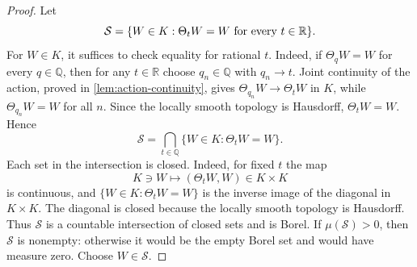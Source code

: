 \documentclass[11pt]{amsart}
\theoremstyle{plain}
\theoremstyle{definition}
\theoremstyle{remark}
\numberwithin{equation}{section}
\begin{document}
\begin{proof}
Let
\[
   \mathcal S=\{W\in K:\Theta_tW=W\hbox{ for every }t\in\mathbb R\}.
\]
For \(W\in K\), it suffices to check equality for rational \(t\).  Indeed,
if \(\Theta_qW=W\) for every \(q\in\mathbb Q\), then for any
\(t\in\mathbb R\) choose \(q_n\in\mathbb Q\) with \(q_n\to t\).  Joint
continuity of the action, proved in \cref{lem:action-continuity}, gives
\(\Theta_{q_n}W\to\Theta_tW\) in \(K\), while \(\Theta_{q_n}W=W\) for all
\(n\).  Since the locally smooth topology is Hausdorff, \(\Theta_tW=W\).
Hence
\[
   \mathcal S
   =
   \bigcap_{t\in\mathbb Q}
   \{W\in K:\Theta_tW=W\}.
\]
Each set in the intersection is closed.  Indeed, for fixed \(t\) the map
\[
   K\ni W\mapsto (\Theta_tW,W)\in K\times K
\]
is continuous, and \(\{W\in K:\Theta_tW=W\}\) is the inverse image of the
diagonal in \(K\times K\).  The diagonal is closed because the locally smooth
topology is Hausdorff.  Thus \(\mathcal S\) is a countable intersection of
closed sets and is Borel.  If \(\mu(\mathcal S)>0\), then \(\mathcal S\) is
nonempty: otherwise it would be the empty Borel set and would have measure
zero.  Choose \(W\in\mathcal S\).


\end{proof}
\end{document}
